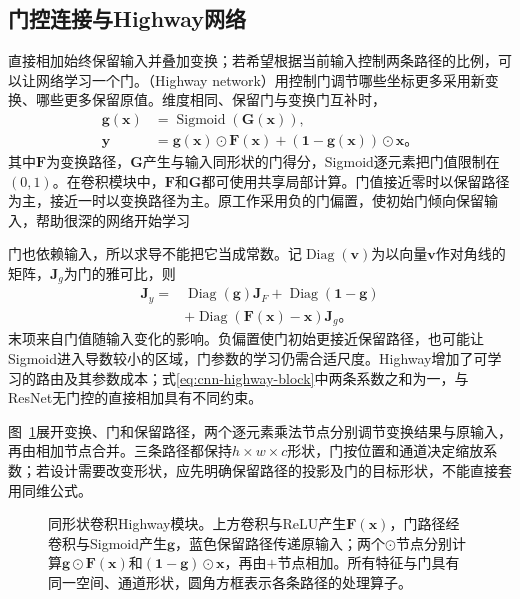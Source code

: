 \subsection{门控连接与Highway网络}
\label{sec:cnn-highway}

直接相加始终保留输入并叠加变换；若希望根据当前输入控制两条路径的比例，可以让网络学习一个门。（Highway network）用控制门调节哪些坐标更多采用新变换、哪些更多保留原值。维度相同、保留门与变换门互补时，
\begin{equation}
  \begin{aligned}
    \bm g(\bm x)&=\operatorname{Sigmoid}(\bm G(\bm x)),\\
    \bm y&=\bm g(\bm x)\odot\bm F(\bm x)
            +(\bm1-\bm g(\bm x))\odot\bm x\text{。}
  \end{aligned}
  \label{eq:cnn-highway-block}
\end{equation}
其中$\bm F$为变换路径，$\bm G$产生与输入同形状的门得分，Sigmoid逐元素把门值限制在$(0,1)$。在卷积模块中，$\bm F$和$\bm G$都可使用共享局部计算。门值接近零时以保留路径为主，接近一时以变换路径为主。原工作采用负的门偏置，使初始门倾向保留输入，帮助很深的网络开始学习

门也依赖输入，所以求导不能把它当成常数。记$\operatorname{Diag}(\bm v)$为以向量$\bm v$作对角线的矩阵，$\bm J_g$为门的雅可比，则
\begin{equation}
  \begin{aligned}
    \bm J_y={}&\operatorname{Diag}(\bm g)\bm J_F
      +\operatorname{Diag}(\bm1-\bm g)\\
      &+\operatorname{Diag}(\bm F(\bm x)-\bm x)\bm J_g\text{。}
  \end{aligned}
  \label{eq:cnn-highway-gradient}
\end{equation}
末项来自门值随输入变化的影响。负偏置使门初始更接近保留路径，也可能让Sigmoid进入导数较小的区域，门参数的学习仍需合适尺度。Highway增加了可学习的路由及其参数成本；式\eqref{eq:cnn-highway-block}中两条系数之和为一，与ResNet无门控的直接相加具有不同约束。

图~\ref{fig:cnn-highway}展开变换、门和保留路径，两个逐元素乘法节点分别调节变换结果与原输入，再由相加节点合并。三条路径都保持$h\times w\times c$形状，门按位置和通道决定缩放系数；若设计需要改变形状，应先明确保留路径的投影及门的目标形状，不能直接套用同维公式。

\begin{figure}[tbp]
  \centering
  
  \caption{同形状卷积Highway模块。上方卷积与ReLU产生$\bm F(\bm x)$，门路径经卷积与Sigmoid产生$\bm g$，蓝色保留路径传递原输入；两个$\odot$节点分别计算$\bm g\odot\bm F(\bm x)$和$(\bm1-\bm g)\odot\bm x$，再由$+$节点相加。所有特征与门具有同一空间、通道形状，圆角方框表示各条路径的处理算子。}
  \label{fig:cnn-highway}
\end{figure}

